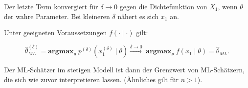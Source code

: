 \documentclass[10pt]{article}
\begin{document}
	Der letzte Term konvergiert für  $\delta \rightarrow 0$ gegen die Dichtefunktion von $X_1$, wenn $\theta$ der wahre Parameter. Bei kleineren $\delta$ nähert es sich $x_1$ an. 
	
	Unter geeigneten Voraussetzungen $f(\cdot\mid\cdot)$ gilt:
	
	\begin{equation*}
		\hat{\theta}_{ML}^{\left(\delta\right)} = \textbf{argmax}_\theta \; p^{\left(\delta\right)} (x^{\left(\delta\right)}_1 \mid \theta) \overset{\delta \rightarrow 0} \longrightarrow \;\textbf{argmax}_\theta \; f(x_1 \mid \theta) = \hat{\theta}_{ML}.
	\end{equation*}
	
	Der ML-Schätzer im stetigen Modell ist dann der Grenzwert von ML-Schätzern, die sich wie zuvor interpretieren lassen. (Ähnliches gilt für $n>1$).
	
\end{document}
